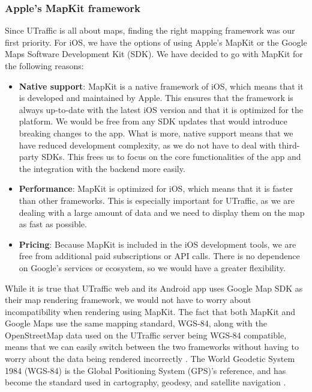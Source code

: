 \subsubsection{Apple's MapKit framework}
Since UTraffic is all about maps, finding the right mapping framework was our first priority. For iOS, we have the options of using Apple's MapKit or the Google Maps Software Development Kit (SDK). We have decided to go with MapKit for the following reasons:
\begin{itemize}
    \item \textbf{Native support}: MapKit is a native framework of iOS, which means that it is developed and maintained by Apple. This ensures that the framework is always up-to-date with the latest iOS version and that it is optimized for the platform. We would be free from any SDK updates that would introduce breaking changes to the app. What is more, native support means that we have reduced development complexity, as we do not have to deal with third-party SDKs. This frees us to focus on the core functionalities of the app and the integration with the backend more easily.
    \item \textbf{Performance}: MapKit is optimized for iOS, which means that it is faster than other frameworks. This is especially important for UTraffic, as we are dealing with a large amount of data and we need to display them on the map as fast as possible.
    \item \textbf{Pricing}: Because MapKit is included in the iOS development tools, we are free from additional paid subscriptions or API calls. There is no dependence on Google's services or ecosystem, so we would have a greater flexibility.
\end{itemize}
While it is true that UTraffic web and its Android app uses Google Map SDK as their map rendering framework, we would not have to worry about incompatibility when rendering using MapKit. The fact that both MapKit and Google Maps use the same mapping standard, WGS-84, along with the OpenStreetMap data used on the UTraffic server being WGS-84 compatible, means that we can easily switch between the two frameworks without having to worry about the data being rendered incorrectly \cite{cllocationcoordinate2d} \cite{a2019_openstreetmap} \cite{google_map}. The World Geodetic System 1984 (WGS-84) is the Global Positioning System (GPS)'s reference, and has become the standard used in cartography, geodesy, and satellite navigation \cite{gisgeography_2015_world}.
